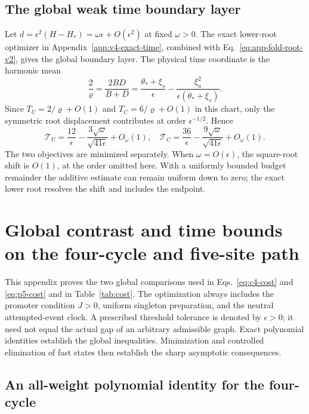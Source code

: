 \documentclass[aps,pre,reprint,amsmath,amssymb,longbibliography]{revtex4-2}
\begin{document}
\subsection{The global weak time boundary layer}
\label{v3-app-global-time-layer}
Let $d=\epsilon^2(H-H_*)=\omega\epsilon+O(\epsilon^2)$ at fixed
$\omega>0$. The exact lower-root optimizer in
Appendix~\ref{app:v4-exact-time}, combined with
Eq.~\eqref{eq:app-fold-root-v2}, gives the global boundary layer.
The physical time coordinate is the harmonic mean
\begin{equation}
 \frac2\varrho=\frac{2BD}{B+D}
 =\frac{\theta_*+\xi_s}{\epsilon}
       -\frac{\xi_a^2}{\epsilon(\theta_*+\xi_s)}.
\end{equation}
Since $T_U=2/\varrho+O(1)$ and $T_C=6/\varrho+O(1)$ in this chart,
only the symmetric root displacement contributes at order
$\epsilon^{-1/2}$. Hence
\begin{equation}
 \mathcal T_U=\frac{12}{\epsilon}-\frac{3\sqrt\omega}{\sqrt{41\epsilon}}
                 +O_\omega(1),\quad
 \mathcal T_C=\frac{36}{\epsilon}-\frac{9\sqrt\omega}{\sqrt{41\epsilon}}
                 +O_\omega(1).
 \label{v3-eq-global-time-layer}
\end{equation}
The two objectives are minimized separately. When $\omega=O(\epsilon)$,
the square-root shift is $O(1)$, at the order omitted here. With a
uniformly bounded budget remainder the additive estimate can remain
uniform down to zero; the exact lower root resolves the shift and
includes the endpoint.

\section{Global contrast and time bounds on the four-cycle and five-site path}
\label{app:resource-comparison}

This appendix proves the two global comparisons used in
Eqs.~\eqref{eq:c4-cost} and \eqref{eq:p5-cost} and in
Table~\ref{tab:cost}. The optimization always includes the promoter
condition \(J>0\), uniform singleton preparation, and the neutral
attempted-event clock. A prescribed threshold tolerance is denoted by
\(\epsilon>0\); it need not equal the actual gap of an arbitrary
admissible graph. Exact polynomial identities establish the global
inequalities. Minimization and controlled elimination of fast
states then establish the sharp asymptotic consequences.

\subsection{An all-weight polynomial identity for the four-cycle}
\end{document}
